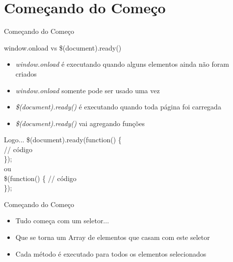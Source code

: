 \section{Começando do Começo}
\begin{frame}{Começando do Começo}
\begin{block}{window.onload vs \$(document).ready()}
\begin{itemize}
	\item \textit{window.onload} é executando quando alguns elementos ainda não foram criados
	\item \textit{window.onload} somente pode ser usado uma vez
	\item \textit{\$(document).ready()} é executando quando toda página foi carregada
	\item \textit{\$(document).ready()} vai agregando funções
\end{itemize}
\end{block}
\begin{block}{Logo...}
	\$(document).ready(function() \{ \\
		// código \\
	\}); \\
	ou \\
	\$(function() \{
		// código \\
	\});
\end{block}
\end{frame}

\begin{frame}{Começando do Começo}
\begin{itemize}
	\item Tudo começa com um seletor...
	\pause \item Que se torna um Array de elementos que casam com este seletor
	\pause \item Cada método é executado para todos os elementos selecionados
\end{itemize}
\end{frame}
